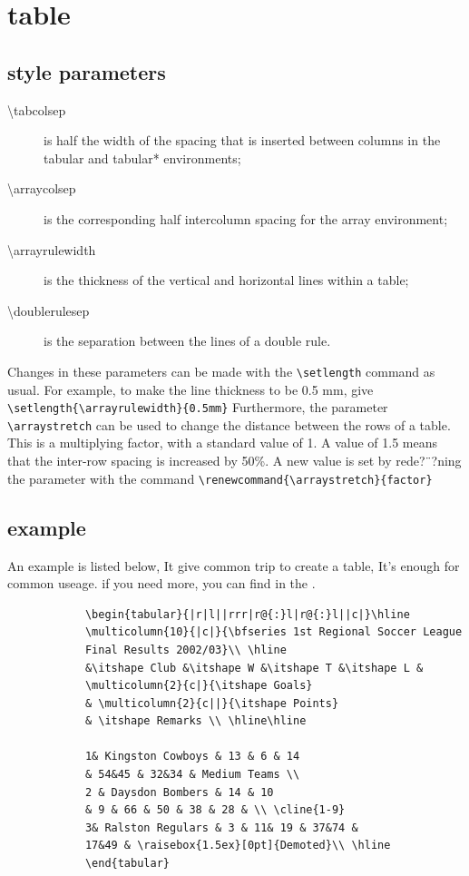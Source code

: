 \documentclass[a4paper,12pt,twoside]{book}
\begin{document}
\section{table}
	\subsection{style parameters}
			\begin{description}	
			\item [\textbackslash{}tabcolsep] is half the width of the spacing that is inserted between columns in the tabular and tabular* environments;
			\item [\textbackslash{}arraycolsep] is the corresponding half intercolumn spacing for the array environment;
			\item [\textbackslash{}arrayrulewidth] is the thickness of the vertical and horizontal lines within a table;
			\item [\textbackslash{}doublerulesep] is the separation between the lines of a double rule.
			\end{description}
	
			Changes in these parameters can be made with the \verb=\setlength= command as usual. For example, to make the line thickness to be 0.5 mm, give \verb=\setlength{\arrayrulewidth}{0.5mm}= Furthermore, the parameter \verb=\arraystretch= can be used to change the distance between the rows of a table. This is a multiplying factor, with a standard value of 1. A value of 1.5 means that the inter-row spacing is increased by 50\%. A new value is set by rede?¨?ning the parameter with the command \linebreak[4] \verb=\renewcommand{\arraystretch}{factor}= \par
		\subsection{example}
			An example is listed below, It give common trip to create a table, It's enough for common useage. if you need more, you can find in the \cite{Companion}.
			\begin{verbatim}
			\begin{tabular}{|r|l||rrr|r@{:}l|r@{:}l||c|}\hline
			\multicolumn{10}{|c|}{\bfseries 1st Regional Soccer League
			Final Results 2002/03}\\ \hline
			&\itshape Club &\itshape W &\itshape T &\itshape L &
			\multicolumn{2}{c|}{\itshape Goals}
			& \multicolumn{2}{c||}{\itshape Points}
			& \itshape Remarks \\ \hline\hline
			
			1& Kingston Cowboys & 13 & 6 & 14
			& 54&45 & 32&34 & Medium Teams \\
			2 & Daysdon Bombers & 14 & 10
			& 9 & 66 & 50 & 38 & 28 & \\ \cline{1-9}
			3& Ralston Regulars & 3 & 11& 19 & 37&74 &
			17&49 & \raisebox{1.5ex}[0pt]{Demoted}\\ \hline
			\end{tabular}
			\end{verbatim}
			
\end{document}

